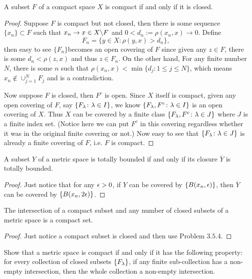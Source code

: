\begin{pro}%
	A subset $F$ of a compact space $X$ is compact if and only if it is closed.
\end{pro}
\begin{proof}
	Suppose $F$ is compact but not closed, then there is some sequence $\{x_n\}\subset F$ such that $x_n\to x\in X\backslash F$ and $0<d_n:=\rho(x_n,x)\to 0$. Define 
	\[F_n=\{y\in X\colon \rho(y,x)>d_n\},\]
	then easy to see $\{F_n\}$becomes an open covering of $F$ since given any $z\in F$, there is some $d_n<\rho(z,x)$ and thus $z\in F_n$. On the other hand, For any finite number $N$, there is some $n$ such that $\rho(x_n,x)<\min\{d_j\colon 1\leq j\leq N\}$, which means $x_n\notin \cup_{j=1}^N F_j$ and is a contradiction.

	Now suppose $F$ is closed, then $F^c$ is open. Since $X$ itself is compact, given any open covering of $F$, say $\{F_{\lambda}\colon \lambda\in I\}$, we know $\{F_\lambda,F^c\colon \lambda\in I\}$ is an open covering of $X$. Thus $X$ can be covered by a finite class $\{F_\lambda,F^c\colon \lambda\in J\}$ where $J$ is a finite index set. (Notice here we can put $F^c$ in this covering regardless whether it was in the original finite covering or not.) Now easy to see that $\{F_\lambda\colon \lambda\in J\}$ is already a finite covering of $F$, i.e. $F$ is compact.
\end{proof}

\begin{pro}%
	A subset $Y$ of a metric space is totally bounded if and only if its closure $\overline{Y}$ is totally bounded.
\end{pro}
\begin{proof}
	Just notice that for any $\epsilon>0$, if $Y$ can be covered by $\{B(x_n,\epsilon)\}$, then $\overline{Y}$ can be covered by $\{B(x_n,2\epsilon)\}$.
\end{proof}

\begin{pro}%
	The intersection of a compact subset and any number of closed subsets of a metric space is a compact set.
\end{pro}
\begin{proof}
	Just notice a compact subset is closed and then use Problem $3.5.4$.
\end{proof}

\begin{pro}%
	Show that a metric space is compact if and only if it has the following property: for every collection of closed subsets $\{F_\lambda\}$, if any finite sub-collection has a non-empty intersection, then the whole collection a non-empty intersection.
\end{pro}
